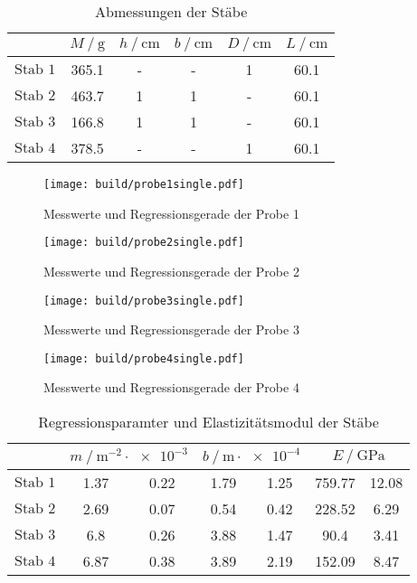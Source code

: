 \begin{table}
  \centering
  \caption{Abmessungen der Stäbe}
  \label{tab:Abmessungen}
  \begin{tabular}{S[table-format=4.0] S[table-format=3.1] S[table-format=1] S[table-format=1] S[table-format=1] S[table-format=2.1]}
  \toprule
  & {$M \mathbin{/} \si{\gram}$} & {$h \mathbin{/} \si{\centi\metre}$} & {$b \mathbin{/} \si{\centi\metre}$}
  & {$D \mathbin{/} \si{\centi\metre}$} & {$L \mathbin{/} \si{\centi\metre}$}\\
  \midrule
  {$\text{Stab 1}$}  & 365.1 & {-} & {-} &  1  & 60.1\\
  {$\text{Stab 2}$}  & 463.7 & 1   & 1   & {-} & 60.1\\
  {$\text{Stab 3}$}  & 166.8 & 1   & 1   & {-} & 60.1\\
  {$\text{Stab 4}$}  & 378.5 & {-} & {-} &  1  & 60.1\\
  \bottomrule
  \end{tabular}
\end{table}
\begin{figure}
  \centering
  \caption{Messwerte und Regressionsgerade der Probe 1}
  \label{fig:probe1single}
  \texttt{[image: build/probe1single.pdf]}
\end{figure}
\begin{figure}
  \centering
  \caption{Messwerte und Regressionsgerade der Probe 2}
  \label{fig:probe2single}
  \texttt{[image: build/probe2single.pdf]}
\end{figure}
\begin{figure}
  \centering
  \caption{Messwerte und Regressionsgerade der Probe 3}
  \label{fig:probe3single}
  \texttt{[image: build/probe3single.pdf]}
\end{figure}
\begin{figure}
  \centering
  \caption{Messwerte und Regressionsgerade der Probe 4}
  \label{fig:probe4single}
  \texttt{[image: build/probe4single.pdf]}
\end{figure}
\begin{table}
  \centering
  \caption{Regressionsparamter und Elastizitätsmodul der Stäbe}
  \label{tab:regression}
  \begin{tabular} {S[table-format=3.0] 
    S[table-format=1.2] @{${}\pm{}$} S[table-format=1.2]
    S[table-format=1.2] @{${}\pm{}$} S[table-format=1.2] 
    S[table-format=3.2] @{${}\pm{}$} S[table-format=2.2]}
  \toprule
  &  & 
     & 
    \\
  \midrule
  {$\text{Stab 1}$}  & 1.37 & 0.22 & 1.79 & 1.25 & 759.77 & 12.08\\
  {$\text{Stab 2}$}  & 2.69 & 0.07 & 0.54 & 0.42 & 228.52 & 6.29  \\
  {$\text{Stab 3}$}  & 6.8  & 0.26 & 3.88 & 1.47 & 90.4   & 3.41 \\ 
  {$\text{Stab 4}$}  & 6.87 & 0.38 & 3.89 & 2.19 & 152.09 & 8.47 \\
  \bottomrule
  \end{tabular}
\end{table}
